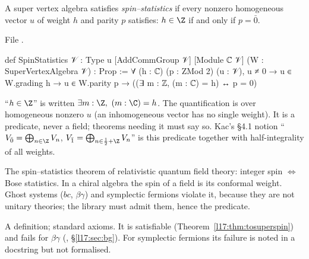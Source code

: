 \begin{definition}\label{l17:def:spinstat}
A super vertex algebra satisfies \emph{spin--statistics} if every nonzero homogeneous vector $u$ of
weight $h$ and parity $p$ satisfies: $h\in\Z$ if and only if $p=\bar0$.
\end{definition}
\noindent File .
\begin{leancode}
def SpinStatistics {𝒱 : Type u} [AddCommGroup 𝒱] [Module ℂ 𝒱]
    (W : SuperVertexAlgebra 𝒱) : Prop :=
  ∀ (h : ℂ) (p : ZMod 2) (u : 𝒱), u ≠ 0 → u ∈ W.grading h → u ∈ W.parity p →
    ((∃ m : ℤ, (m : ℂ) = h) ↔ p = 0)
\end{leancode}
\begin{dictionary}
``$h\in\Z$'' is written $\exists m:\Z,\ (m:\C)=h$. The quantification is over homogeneous nonzero $u$
(an inhomogeneous vector has no single weight). It is a predicate, never a field; theorems needing
it must say so. Kac's §4.1 notion ``$V_{\bar0}=\bigoplus_{n\in\Z}V_n$, $V_{\bar1}=\bigoplus_{n\in\frac12+\Z}V_n$''
is this predicate together with half-integrality of all weights.
\end{dictionary}
\begin{physics}
The spin--statistics theorem of relativistic quantum field theory: integer spin $\Leftrightarrow$
Bose statistics. In a chiral algebra the spin of a field is its conformal weight. Ghost systems
($bc$, $\beta\gamma$) and symplectic fermions violate it, because they are not unitary theories; the
library must admit them, hence the predicate.
\end{physics}
\begin{status}
A definition; standard axioms. It is satisfiable (Theorem~\ref{l17:thm:tosuperspin}) and fails for
$\beta\gamma$ (, §\ref{l17:sec:bg}). For symplectic fermions its
failure is noted in a docstring but not formalised.
\end{status}

